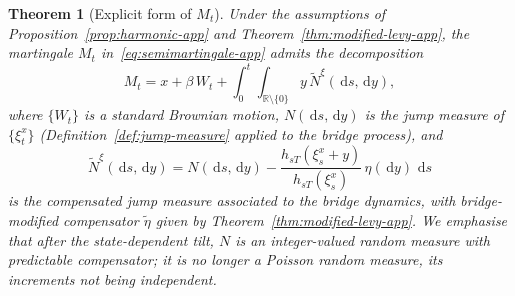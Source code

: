 \documentclass{article}
\newtheorem{thm}{Theorem}[section]
\def\R{\mathbb{R}}
\def\d{\,\mathrm{d}}
\theoremstyle{definition}
\begin{document}
\begin{thm}[Explicit form of $M_t$]
\label{thm:explicit-decomp}
Under the assumptions of Proposition~\ref{prop:harmonic-app} and Theorem~\ref{thm:modified-levy-app}, the martingale $M_t$ in~\eqref{eq:semimartingale-app} admits the decomposition
\begin{equation}\label{eq:explicit-M}
  M_t = x + \beta\,W_t
    + \int_0^t\!\int_{\R \setminus \{0\}} y\,\widetilde{N}^{\xi}(\d s, \d y),
\end{equation}
where $\{W_t\}$ is a standard Brownian motion, $N(\d s, \d y)$ is the jump measure of $\{\xi^{x}_t\}$ (Definition~\ref{def:jump-measure} applied to the bridge process), and
\begin{equation}\label{eq:bridge-compensator-app}
  \widetilde{N}^{\xi}(\d s, \d y)
  = N(\d s, \d y) - \frac{h_{sT}(\xi^{x}_s + y)}{h_{sT}(\xi^{x}_s)}\,\eta(\d y)\,\d s
\end{equation}
is the compensated jump measure associated to the bridge dynamics, with bridge-modified compensator $\widetilde{\eta}$ given by Theorem~\ref{thm:modified-levy-app}. We emphasise that after the state-dependent tilt, $N$ is an integer-valued random measure with predictable compensator; it is no longer a Poisson random measure, its increments not being independent.
\end{thm}
\end{document}
